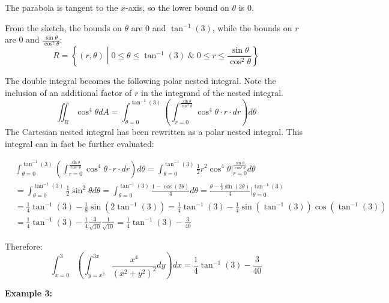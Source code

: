 \documentclass{article}
\begin{document}
The parabola is tangent to the \(x\)-axis, so the lower bound on \(\theta\) is \(0\).

From the sketch, the bounds on \(\theta\) are \(0\) and \(\tan^{-1}(3)\), while the bounds on \(r\) are \(0\) and \(\frac{\sin\theta}{\cos^2\theta}\):
\[R = \left\{(r,\theta)\middle| 0 \leq \theta \leq \tan^{-1}(3) \;\&\; 0 \leq r \leq \frac{\sin\theta}{\cos^2\theta}\right\}\]

The double integral becomes the following polar nested integral. Note the inclusion of an additional factor of \(r\) in the integrand of the nested integral.
\[\iint_R \cos^4\theta dA = \int_{\theta = 0}^{\tan^{-1}(3)} \left(\int_{r = 0}^{\frac{\sin\theta}{\cos^2\theta}} \cos^4\theta \cdot r \cdot dr\right)d\theta\]
The Cartesian nested integral has been rewritten as a polar nested integral. This integral can in fact be further evaluated:

\begin{align*}
& \int_{\theta = 0}^{\tan^{-1}(3)} \left(\int_{r = 0}^{\frac{\sin\theta}{\cos^2\theta}} \cos^4\theta \cdot r \cdot dr\right)d\theta  
= \int_{\theta = 0}^{\tan^{-1}(3)} \frac{1}{2}r^2\cos^4\theta \Big|_{r = 0}^{\frac{\sin\theta}{\cos^2\theta}}d\theta \\
& = \int_{\theta = 0}^{\tan^{-1}(3)} \frac{1}{2}\sin^2\theta d\theta 
= \int_{\theta = 0}^{\tan^{-1}(3)} \frac{1 - \cos(2\theta)}{4} d\theta 
= \frac{\theta - \frac{1}{2}\sin(2\theta)}{4}\Big|_{\theta = 0}^{\tan^{-1}(3)} \\
& = \frac{1}{4}\tan^{-1}(3) - \frac{1}{8}\sin(2\tan^{-1}(3)) 
= \frac{1}{4}\tan^{-1}(3) - \frac{1}{4}\sin(\tan^{-1}(3))\cos(\tan^{-1}(3)) \\
& = \frac{1}{4}\tan^{-1}(3) - \frac{1}{4}\frac{3}{\sqrt{10}}\frac{1}{\sqrt{10}} 
= \frac{1}{4}\tan^{-1}(3) - \frac{3}{40} 
\end{align*}

Therefore:
\[\int_{x = 0}^3 \left(\int_{y = x^2}^{3x} \frac{x^4}{(x^2 + y^2)^2} dy\right)dx = \frac{1}{4}\tan^{-1}(3) - \frac{3}{40}\]




\vspace{5mm}

\textbf{Example 3:}
\end{document}
